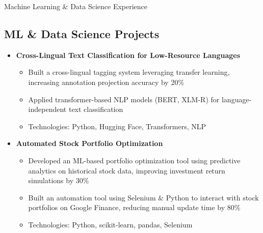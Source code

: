 \documentclass{resume} %
\begin{document}
\begin{rSection}{Machine Learning \& Data Science Experience}
    \subsection*{ML \& Data Science Projects}
        \begin{itemize}
            \item \textbf{Cross-Lingual Text Classification for Low-Resource Languages}
                \begin{itemize}
                    \item Built a cross-lingual tagging system leveraging transfer learning, increasing annotation projection accuracy by 20\%
                    \item Applied transformer-based NLP models (BERT, XLM-R) for language-independent text classification
                    \item Technologies: Python, Hugging Face, Transformers, NLP
                \end{itemize}
            \item \textbf{Automated Stock Portfolio Optimization}
                \begin{itemize}
                    \item Developed an ML-based portfolio optimization tool using predictive analytics on historical stock data, improving investment return simulations by 30\%
                    \item Built an automation tool using Selenium \& Python to interact with stock portfolios on Google Finance, reducing manual update time by 80\%
                    \item Technologies: Python, scikit-learn, pandas, Selenium
                \end{itemize}
        \end{itemize}
\end{rSection}
\end{document}
